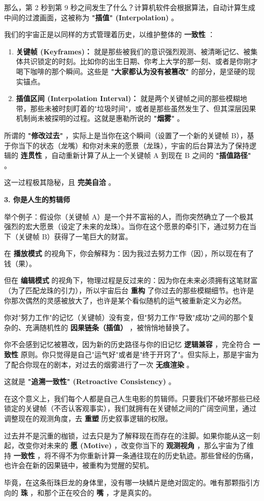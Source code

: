 那么，第 2 秒到第 9 秒之间发生了什么？计算机软件会根据算法，自动计算生成中间的过渡画面，这被称为 \textbf{"插值" (Interpolation)} 。

我们的宇宙正是以同样的方式管理着历史，以维护整体的 \textbf{一致性} ：

\begin{enumerate}
\item \textbf{关键帧 (Keyframes)：} 就是那些被我们的意识强烈观测、被清晰记忆、被集体共识锁定的时刻。比如你的出生日期、你考上大学的那一刻、或者是你刚才喝下咖啡的那个瞬间。这些是 \textbf{"大家都认为没有被篡改"} 的部分，是坚硬的现实锚点。
\item \textbf{插值区间 (Interpolation Interval)：} 就是两个关键帧之间的那些模糊地带，那些未被时刻盯着的"垃圾时间"，或者是那些虽然发生了、但其深层因果机制尚未被探明的过程。这就是惠勒所说的 \textbf{"烟雾"} 。
\end{enumerate}

所谓的 \textbf{"修改过去"} ，实际上是当你在这个瞬间（设置了一个新的关键帧 B），基于你当下的状态（龙嘴）和你对未来的愿景（龙珠），宇宙的后台算法为了保持逻辑的 \textbf{连贯性} ，自动重新计算了从上一个关键帧 A 到现在 B 之间的 \textbf{"插值路径"} 。

这一过程极其隐秘，且 \textbf{完美自洽} 。

\textbf{3. 你是人生的剪辑师}

举个例子：假设你（关键帧 A）是一个并不富裕的人，而你突然确立了一个极其强烈的宏大愿景（设定了未来的龙珠）。当你在这个愿景的牵引下，通过努力在当下（关键帧 B）获得了一笔巨大的财富。

在 \textbf{播放模式} 的视角下，你会解释为：因为我过去努力工作（因），所以现在有了钱（果）。

但在 \textbf{编辑模式} 的视角下，物理过程是反过来的：因为你在未来必须拥有这笔财富（为了匹配龙珠的引力），所以宇宙后台 \textbf{重构} 了你过去的那些模糊细节。也许是你那次偶然的灵感被放大了，也许是某个看似随机的运气被重新定义为必然。

你对"努力工作"的记忆（关键帧）没有变，但"努力工作"导致"成功"之间的那个复杂的、充满随机性的 \textbf{因果链条（插值）} ，被悄悄地替换了。

你不会感到记忆被篡改，因为新的历史路径与你的旧记忆 \textbf{逻辑兼容} ，完全符合 \textbf{一致性} 原则。你只觉得是自己"运气好"或者是"终于开窍了"。但实际上，那是宇宙为了配合你现在的剧本，对过去的烟雾进行了一次 \textbf{无痕渲染} 。

这就是 \textbf{"追溯一致性" (Retroactive Consistency)} 。

在这个意义上，我们每个人都是自己人生电影的剪辑师。只要我们不破坏那些已经锁定的关键帧（不否认客观事实），我们就拥有在关键帧之间的广阔空间里，通过调整现在的观测角度，去 \textbf{重塑} 历史叙事逻辑的权限。

过去并不是沉重的枷锁，过去只是为了解释现在而存在的注脚。如果你能从这一刻起，改变你对未来的 \textbf{愿 (Motive)} ，改变你当下的 \textbf{观测视角} ，那么宇宙为了维持 \textbf{一致性} ，将不得不为你重新计算一条通往现在的历史轨迹。那些曾经的伤痛，也许会在新的因果链中，被重构为觉醒的契机。

毕竟，在这条衔珠巨龙的身体里，没有哪一块鳞片是绝对固定的。唯有那颗指引方向的 \textbf{珠} ，和那个正在咬合的 \textbf{嘴} ，才是真实的。

